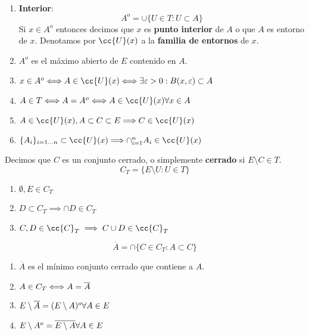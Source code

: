     \begin{definicion}\\
        \begin{enumerate}
            \item \textbf{Interior}:
            $$A^o = \cup \{U\in T: U \subset A\}$$
            Si $x\in A^o$ entonces decimos que $x$ es \textbf{punto interior} de $A$ o que $A$ es entorno de $x$. Denotamos por $\cc{U}(x)$ a la \textbf{familia de entornos} de $x$. 
            \item $A^o$ es el máximo abierto de $E$ contenido en $A$.
            \item $x\in A^o \sii A\in \cc{U}(x) \sii \exists \varepsilon>0 : B(x, \varepsilon ) \subset A$ 
            \item $A\in T \sii A=A^o \sii A\in \cc{U}(x) \\ \forall x \in A$
            \item $A\in \cc{U}(x), \\ A \subset C \subset E \Longrightarrow C \in \cc{U}(x)$
            \item $\{ A_i \}_{i=1...n} \subset \cc{U}(x) \Longrightarrow \cap_{i=1}^n A_i \in \cc{U}(x)$
        \end{enumerate}
           
    \end{definicion}
   
    \begin{definicion}
        Decimos que $C$ es un conjunto cerrado, o simplemente \textbf{cerrado} si $E\setminus C \in T$. \\
        $$C_T = \{ E\setminus U : U \in T\}$$
        \begin{enumerate}
            \item $\emptyset, E \in C_T$
            \item $D \subset C_T  \implies \cap D \in C_T$
            \item $C,D \in \cc{C}_T \implies C \cup D \in \cc{C}_T$ 
        \end{enumerate}    
    \end{definicion}
    
    \begin{definicion}[Cierre]
        $$\overline{A} = \cap \{ C \in C_T : A \subset C\}$$
        \begin{enumerate}
            \item $\overline{A}$ es el mínimo conjunto cerrado que contiene a $A$.
            \item $A \in C_T \Longleftrightarrow A = \overline{A}$
            \item $E\setminus \overline{A} = (E\setminus A)^o \\ \forall A \in E$
            \item $E\setminus A^o = \overline{E\setminus A} \\ \forall A \in E$
        \end{enumerate}
    \end{definicion}

